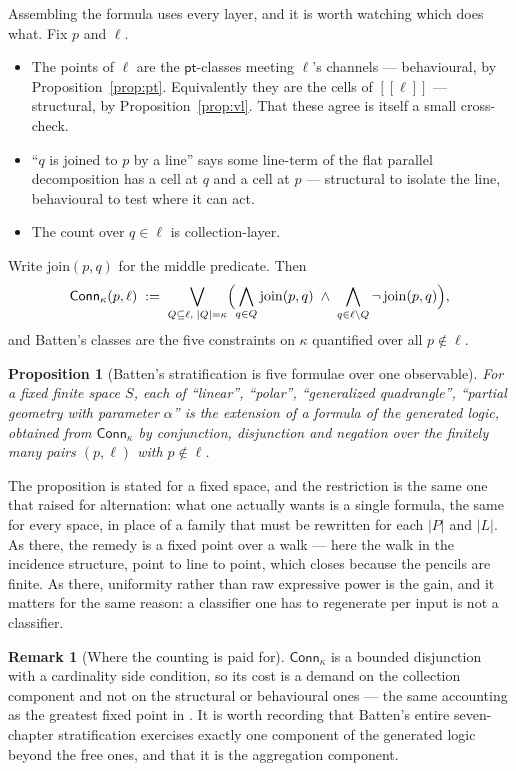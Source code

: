 \documentclass[11pt]{article}
\theoremstyle{plain}
\newtheorem{proposition}[theorem]{Proposition}
\theoremstyle{definition}
\newtheorem{remark}[theorem]{Remark}
\newcommand{\enc}[1]{[\![#1]\!]}
\newcommand{\pt}{\mathsf{pt}}
\newcommand{\Conn}{\mathsf{Conn}}
\begin{document}
Assembling the formula uses every layer, and it is worth watching which does what. Fix $p$ and
$\ell$.
\begin{itemize}
\item The points of $\ell$ are the $\pt$-classes meeting $\ell$'s channels --- behavioural, by
      Proposition~\ref{prop:pt}. Equivalently they are the cells of $\enc{\ell}$ --- structural, by
      Proposition~\ref{prop:vl}. That these agree is itself a small cross-check.
\item ``$q$ is joined to $p$ by a line'' says some line-term of the flat parallel decomposition has
      a cell at $q$ and a cell at $p$ --- structural to isolate the line, behavioural to test where
      it can act.
\item The count over $q \in \ell$ is collection-layer.
\end{itemize}
Write $\mathrm{join}(p,q)$ for the middle predicate. Then
\[
\Conn_{\kappa}(p,\ell) \;:=\; \bigvee_{\substack{Q \subseteq \ell,\; |Q|=\kappa}}
\Bigl( \bigwedge_{q \in Q} \mathrm{join}(p,q) \;\wedge\; \bigwedge_{q \in \ell \setminus Q}
\neg\,\mathrm{join}(p,q) \Bigr),
\]
and Batten's classes are the five constraints on $\kappa$ quantified over all $p \notin \ell$.

\begin{proposition}[Batten's stratification is five formulae over one observable]
\label{prop:batten}
For a fixed finite space $S$, each of ``linear'', ``polar'', ``generalized quadrangle'', ``partial
geometry with parameter $\alpha$'' is the extension of a formula of the generated logic, obtained
from $\Conn_\kappa$ by conjunction, disjunction and negation over the finitely many pairs
$(p,\ell)$ with $p \notin \ell$.
\end{proposition}

The proposition is stated for a fixed space, and the restriction is the same one that
\cite[Rem.~4]{Classifier} raised for alternation: what one actually wants is a single formula, the
same for every space, in place of a family that must be rewritten for each $|P|$ and $|L|$. As
there, the remedy is a fixed point over a walk --- here the walk in the incidence structure, point
to line to point, which closes because the pencils are finite. As there, uniformity rather than raw
expressive power is the gain, and it matters for the same reason: a classifier one has to
regenerate per input is not a classifier.

\begin{remark}[Where the counting is paid for]
$\Conn_\kappa$ is a bounded disjunction with a cardinality side condition, so its cost is a demand
on the collection component and not on the structural or behavioural ones --- the same accounting
as the greatest fixed point in \cite[\S2.3.1]{Classifier}. It is worth recording that Batten's
entire seven-chapter stratification exercises exactly one component of the generated logic beyond
the free ones, and that it is the aggregation component.
\end{remark}
\end{document}

